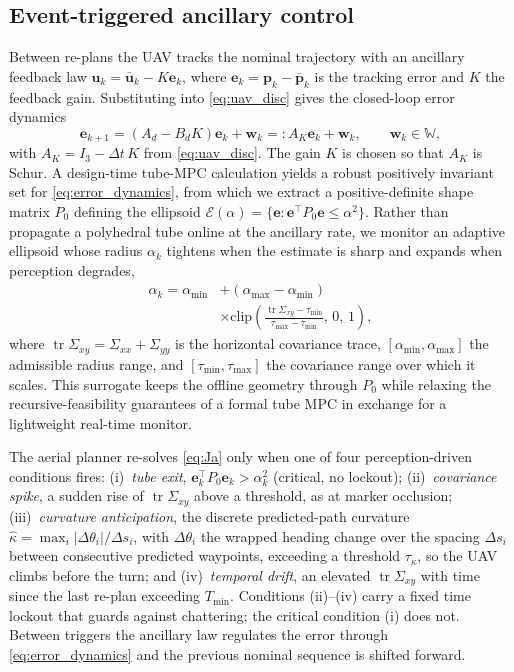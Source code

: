 \documentclass{ifacconf}
\begin{document}
\subsection{Event-triggered ancillary control}
\label{sec:trigger}
Between re-plans the UAV tracks the nominal trajectory with an ancillary feedback law
$\mathbf{u}_k=\bar{\mathbf{u}}_k-K\mathbf{e}_k$, where $\mathbf{e}_k=\mathbf{p}_k-\bar{\mathbf{p}}_k$ is
the tracking error and $K$ the feedback gain. Substituting into \eqref{eq:uav_disc} gives the
closed-loop error dynamics
\begin{equation}
\mathbf{e}_{k+1}=(A_d-B_dK)\mathbf{e}_k+\mathbf{w}_k=:A_K\mathbf{e}_k+\mathbf{w}_k,\qquad\mathbf{w}_k\in\mathbb{W},
\label{eq:error_dynamics}
\end{equation}
with $A_K=I_3-\Delta t\,K$ from \eqref{eq:uav_disc}. The gain $K$ is chosen so that $A_K$ is Schur. A
design-time tube-MPC calculation \citep{mayne2005robust,mRPI} yields a robust positively invariant set
for \eqref{eq:error_dynamics}, from which we extract a positive-definite shape matrix $P_0$ defining
the ellipsoid $\mathcal{E}(\alpha)=\{\mathbf{e}:\mathbf{e}^{\!\top}P_0\mathbf{e}\le\alpha^2\}$. Rather
than propagate a polyhedral tube online at the ancillary rate, we monitor an adaptive ellipsoid whose
radius $\alpha_k$ tightens when the estimate is sharp and expands when perception degrades,
\begin{equation}
\begin{split}
\alpha_k=\alpha_{\min}&+(\alpha_{\max}-\alpha_{\min})\\
&\times\mathrm{clip}\!\left(\frac{\operatorname{tr}\Sigma_{xy}-\tau_{\min}}{\tau_{\max}-\tau_{\min}},\,0,\,1\right),
\end{split}
\label{eq:surrogate}
\end{equation}
where $\operatorname{tr}\Sigma_{xy}=\Sigma_{xx}+\Sigma_{yy}$ is the horizontal covariance trace,
$[\alpha_{\min},\alpha_{\max}]$ the admissible radius range, and $[\tau_{\min},\tau_{\max}]$ the
covariance range over which it scales. This surrogate keeps the offline geometry through $P_0$ while
relaxing the recursive-feasibility guarantees of a formal tube MPC in exchange for a lightweight
real-time monitor.

The aerial planner re-solves \eqref{eq:Ja} only when one of four perception-driven conditions fires:
(i)~\emph{tube exit}, $\mathbf{e}_k^{\!\top}P_0\mathbf{e}_k>\alpha_k^2$ (critical, no lockout);
(ii)~\emph{covariance spike}, a sudden rise of $\operatorname{tr}\Sigma_{xy}$ above a threshold, as at
marker occlusion; (iii)~\emph{curvature anticipation}, the discrete predicted-path curvature
$\hat\kappa=\max_i|\Delta\theta_i|/\Delta s_i$, with $\Delta\theta_i$ the wrapped heading change over
the spacing $\Delta s_i$ between consecutive predicted waypoints, exceeding a threshold $\tau_\kappa$,
so the UAV climbs before the turn; and (iv)~\emph{temporal drift}, an elevated
$\operatorname{tr}\Sigma_{xy}$ with time since the last re-plan exceeding $T_{\min}$. Conditions
(ii)--(iv) carry a fixed time lockout that guards against chattering; the critical condition (i) does
not. Between triggers the ancillary law regulates the error through \eqref{eq:error_dynamics} and the
previous nominal sequence is shifted forward.
\end{document}
